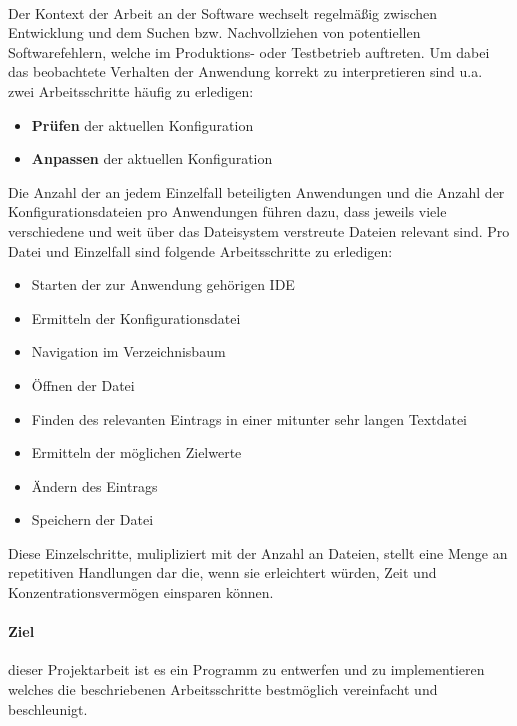 \paragraph{}
Der Kontext der Arbeit an der Software wechselt regelmäßig zwischen Entwicklung und
dem Suchen bzw. Nachvollziehen von potentiellen Softwarefehlern, welche im Produktions-
oder Testbetrieb auftreten. Um dabei das beobachtete Verhalten der Anwendung korrekt
zu interpretieren sind u.a. zwei Arbeitsschritte häufig zu erledigen:

\begin{itemize}
    \item \textbf{Prüfen} der aktuellen Konfiguration
    \item \textbf{Anpassen} der aktuellen Konfiguration
\end{itemize}

Die Anzahl der an jedem Einzelfall beteiligten Anwendungen und die Anzahl der
Konfigurationsdateien pro Anwendungen führen dazu, dass jeweils viele verschiedene
und weit über das Dateisystem verstreute Dateien relevant sind. Pro Datei und
Einzelfall sind folgende Arbeitsschritte zu erledigen:

\begin{itemize}
    \item Starten der zur Anwendung gehörigen IDE
    \item Ermitteln der Konfigurationsdatei
    \item Navigation im Verzeichnisbaum
    \item Öffnen der Datei
    \item Finden des relevanten Eintrags in einer mitunter sehr langen Textdatei
    \item Ermitteln der möglichen Zielwerte
    \item Ändern des Eintrags
    \item Speichern der Datei
\end{itemize}

Diese Einzelschritte, mulipliziert mit der Anzahl an Dateien, stellt eine
Menge an repetitiven Handlungen dar die, wenn sie erleichtert würden, Zeit und
Konzentrationsvermögen einsparen können.

\paragraph{Ziel}
dieser Projektarbeit ist es ein Programm zu entwerfen und zu implementieren
welches die beschriebenen Arbeitsschritte bestmöglich vereinfacht und beschleunigt.
